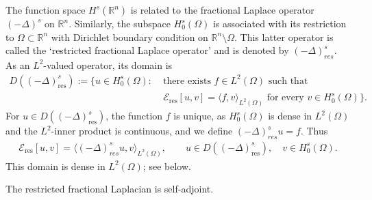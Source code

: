 \documentclass[preprint,12pt]{elsarticle}
\newcommand{\R}{\mathbb R}
\begin{document}
The function space $H^s(\R^n)$ is related to the fractional Laplace operator $(-\Delta)^s$ on $\R^n$. Similarly, the subspace $H^s_0(\Omega)$ is associated with its restriction to $\Omega\subset\R^n$ with Dirichlet boundary condition on $\R^n\setminus\Omega$. This latter operator is called the `restricted fractional Laplace operator' and is denoted by $(-\Delta)^s_{res}$. As an $L^2$-valued operator, its domain is
\begin{align}\label{operator_domain_res_frac_lap}
D((-\Delta)^s_{\mathrm{res}}):=\big\{u\in H^s_0(\Omega):\;&\text{there exists }f\in L^2(\Omega)
\text{ such that} \nonumber\\
&\mathcal{E}_{\mathrm{res}}[u,v]
 =\langle f,v\rangle_{L^2(\Omega)}
 \text{ for every }v\in H^s_0(\Omega)\big\}.
\end{align}
For $u\in D((-\Delta)^s_{\mathrm{res}})$, the function $f$ is unique, as
$H^s_0(\Omega)$ is dense in $L^2(\Omega)$ and the $L^2$-inner product is continuous, and we define
$(-\Delta)^s_{res} u=f$. Thus
\begin{align}\label{operator_form_identity}
    \mathcal{E}_{\mathrm{res}}[u,v]
    =\langle (-\Delta)^s_{res} u,v\rangle_{L^2(\Omega)},
    \qquad u\in D((-\Delta)^s_{\mathrm{res}}),\quad v\in H^s_0(\Omega).
\end{align}
This domain is dense in $L^2(\Omega)$; see below.

The restricted fractional Laplacian is self-adjoint. 
\end{document}

